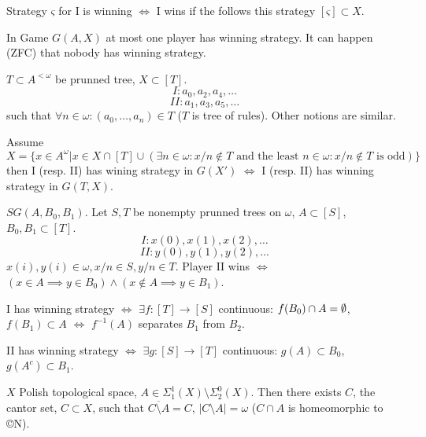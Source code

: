 \documentclass[12pt]{article}					%
\begin{document}
\begin{definice}
	Strategy $ς$ for I is winning $\Leftrightarrow$ I wins if the follows this strategy $[ς] \subset X$.
\end{definice}

\begin{poznamka}
	In Game $G(A, X)$ at most one player has winning strategy. It can happen (ZFC) that nobody has winning strategy.
\end{poznamka}

\begin{definice}
	$T \subset A^{<ω}$ be prunned tree, $X \subset [T]$. 
	$$ I: a_0, a_2, a_4, … $$
	$$ II: a_1, a_3, a_5, … $$
	such that $\forall n \in ω: (a_0, …, a_n) \in T$ ($T$ is tree of rules). Other notions are similar.
\end{definice}

\begin{poznamka}
	Assume $X = \{x \in A^ω | x \in X \cap [T] \cup (\exists n \in ω: x / n \notin T \text{ and the least } n \in ω: x / n \notin T \text{ is odd})\}$ then I (resp. II) has wining strategy in $G(X')$ $\Leftrightarrow$ I (resp. II) has winning strategy in $G(T, X)$.
\end{poznamka}

\begin{priklady}
	$SG(A, B_0, B_1)$. Let $S, T$ be nonempty prunned trees on $ω$, $A \subset [S]$, $B_0, B_1 \subset [T]$.
	$$ I: x(0), x(1), x(2), … $$
	$$ II: y(0), y(1), y(2), … $$
	$x(i), y(i) \in ω, x / n \in S, y / n \in T$. Player II wins $\Leftrightarrow$ $(x \in A \implies y \in B_0) \land (x \notin A \implies y \in B_1)$.

	I has winning strategy $\Leftrightarrow$ $\exists f: [T] \rightarrow [S]$ continuous: $f(B_0) \cap A = \emptyset$, $f(B_1) \subset A$ $\Leftrightarrow$ $f^{-1}(A)$ separates $B_1$ from $B_2$.

	II has winning strategy $\Leftrightarrow$ $\exists g: [S] \rightarrow [T]$ continuous: $g(A) \subset B_0$, $g(A^c) \subset B_1$.
\end{priklady}


\begin{veta}[H?]
	$X$ Polish topological space, $A \in Σ_1^1(X) \setminus Σ_2^0(X)$. Then there exists $C$, the cantor set, $C \subset X$, such that $\overline{C \setminus A} = C$, $|C \setminus A| = ω$ ($C \cap A$ is homeomorphic to ©N).
\end{veta}
\end{document}
